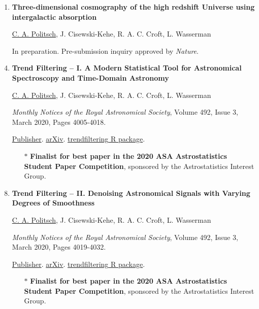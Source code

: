 \documentclass[letterpaper,10pt]{article}
\begin{document}
\begin{enumerate}[leftmargin=0.6cm, itemsep=-0.05cm]
\item {\bf Three-dimensional cosmography of the high redshift Universe using intergalactic absorption} 
\item[] \underline{C. A. Politsch}, J. Cisewski-Kehe, R. A. C. Croft, L. Wasserman
\item[] {In preparation. Pre-submission inquiry approved by {\it Nature}}.

\vspace{0.3cm}

\item {\bf Trend Filtering -- I. A Modern Statistical Tool for Astronomical Spectroscopy and Time-Domain Astronomy}
\item[] \underline{C. A. Politsch}, J. Cisewski-Kehe, R. A. C. Croft, L. Wasserman
\item[] {\it Monthly Notices of the Royal Astronomical Society}, Volume 492, Issue 3, March 2020, Pages 4005-4018.
\item[] \href{https://doi.org/10.1093/mnras/staa106}{Publisher}. 
\href{https://arxiv.org/abs/1908.07151}{arXiv}. 
\href{https://capolitsch.github.io/trendfiltering}{\textsf{trendfiltering} R package}.
\begin{itemize}
\item[$\boldsymbol{\ast}$]{\bf Finalist for best paper in the 2020 ASA Astrostatistics Student Paper Competition}, sponsored by the Astrostatistics Interest Group.
\end{itemize}

\vspace{0.3cm}

\item {\bf Trend Filtering -- II. Denoising Astronomical Signals with Varying Degrees of Smoothness}
\item[] \underline{C. A. Politsch}, J. Cisewski-Kehe, R. A. C. Croft, L. Wasserman
\item[] {\it Monthly Notices of the Royal Astronomical Society}, Volume 492, Issue 3, March 2020, Pages 4019-4032.
\item[] \href{https://doi.org/10.1093/mnras/staa110}{Publisher}. 
\href{https://arxiv.org/abs/2001.03552}{arXiv}.
\href{https://capolitsch.github.io/trendfiltering}{\textsf{trendfiltering} R package}.
\begin{itemize}
\item[$\boldsymbol{\ast}$]{\bf Finalist for best paper in the 2020 ASA Astrostatistics Student Paper Competition}, sponsored by the Astrostatistics Interest Group.
\end{itemize}


\end{enumerate}
\end{document}
